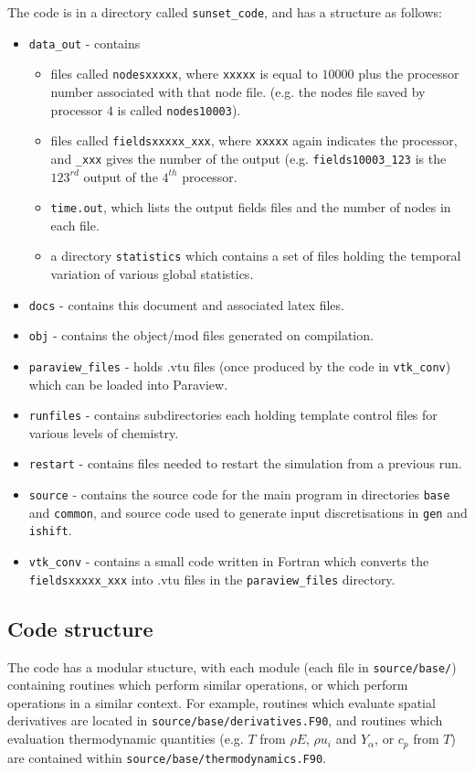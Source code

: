 \documentclass[notitlepage]{revtex4-1}
\begin{document}
The code is in a directory called \verb|sunset_code|, and has a structure as follows:
\begin{itemize}
\item \verb|data_out| - contains
\begin{itemize}
\item files called \verb|nodesxxxxx|, where \verb|xxxxx| is equal to $10000$ plus the processor number associated with that node file. (e.g. the nodes file saved by processor $4$ is called \verb|nodes10003|).
\item files called \verb|fieldsxxxxx_xxx|, where \verb|xxxxx| again indicates the processor, and \verb|_xxx| gives the number of the output (e.g. \verb|fields10003_123| is the $123^{rd}$ output of the $4^{th}$ processor.
\item \verb|time.out|, which lists the output fields files and the number of nodes in each file.
\item a directory \verb|statistics| which contains a set of files holding the temporal variation of various global statistics. 
\end{itemize}
\item \verb|docs| - contains this document and associated latex files.
\item \verb|obj| - contains the object/mod files generated on compilation.
\item \verb|paraview_files| - holds .vtu files (once produced by the code in \verb|vtk_conv|) which can be loaded into Paraview.
\item \verb|runfiles| - contains subdirectories each holding template control files for various levels of chemistry.
\item \verb|restart| - contains files needed to restart the simulation from a previous run.
\item \verb|source| - contains the source code for the main program in directories \verb|base| and \verb|common|, and source code used to generate input discretisations in \verb|gen| and \verb|ishift|.
\item \verb|vtk_conv| - contains a small code written in Fortran which converts the \verb|fieldsxxxxx_xxx| into .vtu files in the \verb|paraview_files| directory.
\end{itemize}

\subsection{Code structure}

The code has a modular stucture, with each module (each file in \verb|source/base/|) containing routines which perform similar operations, or which perform operations in a similar context. For example, routines which evaluate spatial derivatives are located in \verb|source/base/derivatives.F90|, and routines which evaluation thermodynamic quantities (e.g. $T$ from $\rho{E}$, $\rho{u}_{i}$ and $Y_{\alpha}$, or $c_{p}$ from $T$) are contained within \verb|source/base/thermodynamics.F90|.
\end{document}
